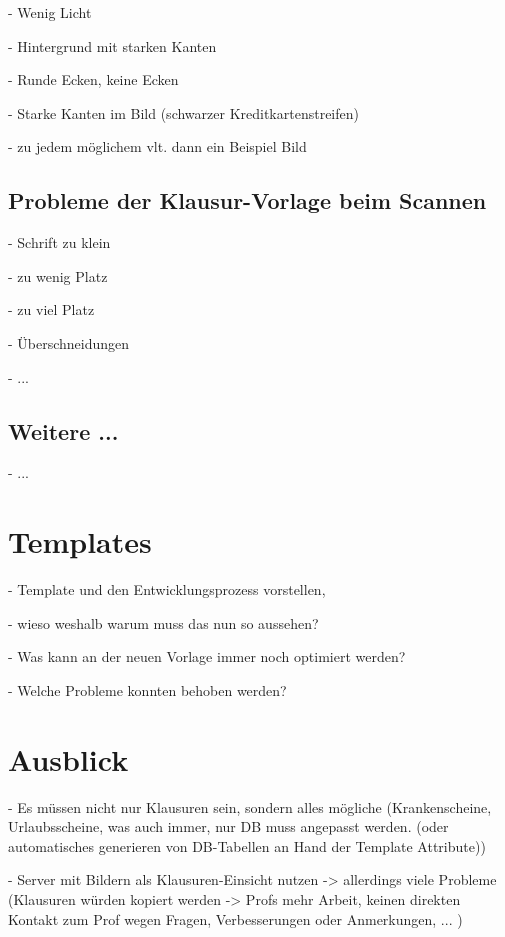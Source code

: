 \documentclass[nomenclature, 150]{HSMW-Thesis}
\begin{document}
		- Wenig Licht
		
		- Hintergrund mit starken Kanten
		
		- Runde Ecken, keine Ecken
		
		- Starke Kanten im Bild (schwarzer Kreditkartenstreifen)
		
		- zu jedem möglichem vlt. dann ein Beispiel Bild
		
	\section{Probleme der Klausur-Vorlage beim Scannen}
		- Schrift zu klein
		
		- zu wenig Platz
		
		- zu viel Platz
		
		- Überschneidungen
		
		- ...
		
	\section{Weitere ...}
		- ...




\chapter{Templates}
	- Template und den Entwicklungsprozess vorstellen, 
	
	- wieso weshalb warum muss das nun so aussehen?
	
	- Was kann an der neuen Vorlage immer noch optimiert werden?	
	
	- Welche Probleme konnten behoben werden?
	



		
\chapter{Ausblick}
	- Es müssen nicht nur Klausuren sein, sondern alles mögliche (Krankenscheine, Urlaubsscheine, was auch immer, nur DB muss angepasst werden. (oder automatisches generieren von DB-Tabellen an Hand der Template Attribute))
	
	- Server mit Bildern als Klausuren-Einsicht nutzen -> allerdings viele Probleme (Klausuren würden kopiert werden -> Profs mehr Arbeit, keinen direkten Kontakt zum Prof wegen Fragen, Verbesserungen oder Anmerkungen, ... )
	
\end{document}

